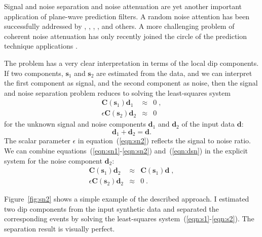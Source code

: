 Signal and noise separation and noise attenuation are yet another
important application of plane-wave prediction filters. A random noise
attention has been successfully addressed by
\cite{SEG-1984-S10.1}, \cite{SEG-1986-POS2.10},
\cite{GEO60-06-18871896}, \cite{SEG-1995-0711}, and others. A
more challenging problem of coherent noise attenuation has only recently
joined the circle of the prediction technique applications
\cite[]{TLE18-01-00550058,morganSEG,SEG-2001-13051308}.
\par
The problem has a very clear interpretation in terms of the local dip
components. If two components, $\mathbf{s}_1$ and $\mathbf{s}_2$ are
estimated from the data, and we can interpret the first component as
signal, and the second component as noise, then the signal and noise
separation problem reduces to solving the least-squares system
\begin{eqnarray}
  \label{eqn:sn1}
  \mathbf{C}(\mathbf{s}_1) \mathbf{d}_1 & \approx & 0 \;, \\
  \label{eqn:sn2}
  \epsilon \mathbf{C}(\mathbf{s}_2) \mathbf{d}_2 & \approx & 0 \;
\end{eqnarray}
for the unknown signal and noise components $\mathbf{d}_1$ and
$\mathbf{d}_2$ of the input data $\mathbf{d}$:
\begin{equation}
  \label{eqn:dsn}
  \mathbf{d}_1 + \mathbf{d}_2 = \mathbf{d}.
\end{equation}
The scalar parameter $\epsilon$ in equation~(\ref{eqn:sn2}) reflects
the signal to noise ratio. We can combine equations~(\ref{eqn:sn1}-\ref{eqn:sn2})
and~(\ref{eqn:dsn}) in the explicit system for the
noise component $\mathbf{d}_2$:
\begin{eqnarray}
  \label{eqn:s1}
  \mathbf{C}(\mathbf{s}_1) \mathbf{d}_2 & \approx & 
  \mathbf{C}(\mathbf{s}_1) \mathbf{d}\;, \\
  \label{eqn:s2}
  \epsilon \mathbf{C}(\mathbf{s}_2) \mathbf{d}_2 & \approx & 0 \;.
\end{eqnarray}
\par
Figure~\ref{fig:sn2} shows a simple example of the described approach.
I estimated two dip components from the input synthetic data and
separated the corresponding events by solving the least-squares
system~(\ref{eqn:s1}-\ref{eqn:s2}). The separation result is visually
perfect.

\par

